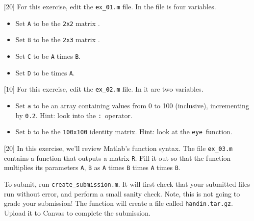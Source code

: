 \documentclass{16384_doc}
\begin{document}
\begin{questions}
    [20]
        For this exercise, edit the \verb!ex_01.m! file. In the file is four
        variables.
        \begin{itemize}
            \item Set \verb!A! to be the \verb!2x2! matrix .
            \item Set \verb!B! to be the \verb!2x3! matrix .
            \item Set \verb!C! to be \verb!A! times \verb!B!.
            \item Set \verb!D! to be  times \verb!A!.
        \end{itemize}

    [10]
        For this exercise, edit the \verb!ex_02.m! file.  In it are two
        variables.
        \begin{itemize}
            \item Set \verb!a! to be an array containing values from 0 to 100
                (inclusive), incrementing by \verb!0.2!. Hint: look into the
                \verb!:!\footnotemark~operator.

            \item Set \verb!b! to be the \verb!100x100! identity matrix. Hint:
                look at the \verb!eye!\footnotemark~function.

        \end{itemize}

    [20]
        In this exercise, we'll review Matlab's function syntax.  The file
        \verb!ex_03.m! contains a function that outputs a matrix \verb!R!.  Fill it out
        so that the function multiplies its parameters \verb!A!, \verb!B! as
        \verb!A! times \verb!B! times \verb!A! times \verb!B!.

        To submit, run \verb!create_submission.m!.  It will first check that
        your submitted files run without error, and perform a small sanity
        check.  Note, this is not going to grade your submission!  The function
        will create a file called \verb!handin.tar.gz!.  Upload it to Canvas to
        complete the submission.

\end{questions}
\end{document}
